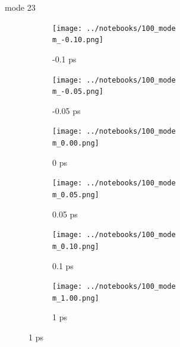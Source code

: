 \documentclass{beamer}
\newcommand\w{0.32}
\begin{document}
\renewcommand\m{23}
\begin{frame}{mode \m}
	\begin{figure}
		\centering
		\begin{subfigure}[b]{\w\textwidth}
			\centering
			\texttt{[image: ../notebooks/100\_mode\\m\_-0.10.png]}
			\caption{-0.1 ps}
		\end{subfigure}
		\begin{subfigure}[b]{\w\textwidth}
			\centering
			\texttt{[image: ../notebooks/100\_mode\\m\_-0.05.png]}
			\caption{-0.05 ps}
		\end{subfigure}
		\begin{subfigure}[b]{\w\textwidth}
			\centering
			\texttt{[image: ../notebooks/100\_mode\\m\_0.00.png]}
			\caption{0 ps}
		\end{subfigure}
		\begin{subfigure}[b]{\w\textwidth}
			\centering
			\texttt{[image: ../notebooks/100\_mode\\m\_0.05.png]}
			\caption{0.05 ps}
		\end{subfigure}
		\begin{subfigure}[b]{\w\textwidth}
			\centering
			\texttt{[image: ../notebooks/100\_mode\\m\_0.10.png]}
			\caption{0.1 ps}
		\end{subfigure}
		\begin{subfigure}[b]{\w\textwidth}
			\centering
			\texttt{[image: ../notebooks/100\_mode\\m\_1.00.png]}
			\caption{1 ps}
		\end{subfigure}
	\end{figure}
\end{frame}
\end{document}
